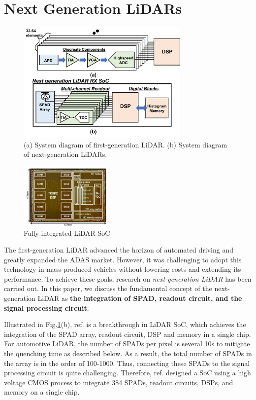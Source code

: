 \documentclass[paper]{ieice}
\begin{document}
\section{Next Generation LiDARs}
\begin{figure}[!t]
\centering
 \includegraphics[width=0.75\textwidth]{figs/nextlidar.png}
  \caption{(a) System diagram of first-generation LiDAR. (b) System diagram of next-generation LiDARs.}
\label{next}
\end{figure}

\begin{figure}[!t]
\centering
 \includegraphics[width=0.4\textwidth]{figs/niclasschip.png}
  \caption{Fully integrated LiDAR SoC \cite{niclass2012100}}
\label{chip}
\end{figure}

\qquad The first-generation LiDAR advanced the horizon of automated driving and greatly expanded the ADAS market. However, it was challenging to adopt this technology in mass-produced vehicles without lowering costs and extending its performance. 
To achieve these goals, research on \textit{next-generation LiDAR} has been carried out.
In this paper, we discuss the fundamental concept of the next-generation LiDAR as \textbf{the integration of SPAD, readout circuit, and the signal processing circuit}.

Illustrated in Fig.\ref{next}(b), ref.\cite{niclass2012100} is a breakthrough in LiDAR SoC, which achieves the integration of the SPAD array, readout circuit, DSP and memory in a single chip. For automotive LiDAR, the number of SPADs per pixel is several 10s to mitigate the quenching time as described below. As a result, the total number of SPADs in the array is in the order of 100-1000. Thus, connecting these SPADs to the signal processing circuit is quite challenging. Therefore, ref.\cite{niclass2012100} designed a SoC using a high voltage CMOS process to integrate 384 SPADs, readout circuits, DSPs, and memory on a single chip.
\end{document}
